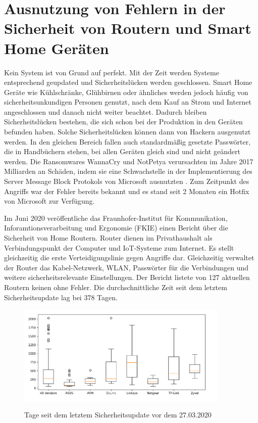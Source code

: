 \documentclass[12pt, a4paper, onecolumn, oneside, toc=bibliographynumbered, liststotoc]{scrreprt} %
\begin{document}
	\section{Ausnutzung von Fehlern in der Sicherheit von Routern und Smart Home Geräten}
 Kein System ist von Grund auf perfekt. Mit der Zeit werden Systeme entsprechend geupdated und Sicherheitslücken werden geschlossen. Smart Home Geräte wie Kühlschränke, Glühbirnen oder ähnliches werden jedoch häufig von sicherheitsunkundigen Personen genutzt, nach dem Kauf an Strom und Internet angeschlossen und danach nicht weiter beachtet. Dadurch bleiben Sicherheitslücken bestehen, die sich schon bei der Produktion in den Geräten befunden haben. Solche Sicherheitslücken können dann von Hackern ausgenutzt werden. In den gleichen Bereich fallen auch standardmäßig gesetzte Passwörter, die in Handbüchern stehen, bei allen Geräten gleich sind und nicht geändert werden. Die Ransomwares WannaCry und NotPetya verursachten im Jahre 2017 Milliarden an Schäden, indem sie eine Schwachstelle in der Implementierung des Server Message Block Protokols von Microsoft ausnutzten \parencite[5]{Chantzis.2021}. Zum Zeitpunkt des Angriffs war der Fehler bereits bekannt und es stand seit 2 Monaten ein Hotfix von Microsoft zur Verfügung.
 
 Im Juni 2020 veröffentliche das Fraunhofer-Institut für Kommunikation, Inforamtionsverarbeitung und Ergonomie (FKIE) einen Bericht über die Sicherheit von Home Routern. Router dienen im Privathaushalt als Verbindungspunkt der Computer und IoT-Systeme zum Internet. Es stellt gleichzeitig die erste Verteidigungslinie gegen Angriffe dar. Gleichzeitig verwaltet der Router das Kabel-Netzwerk, WLAN, Passwörter für die Verbindungen und weitere sicherheitsrelevante Einstellungen. Der Bericht listete von 127 aktuellen Routern keinen ohne Fehler. Die durchschnittliche Zeit seit dem letztem Sicherheitsupdate lag bei 378 Tagen.
\begin{figure}[H]
	\centering
	\caption{Tage seit dem letztem Sicherheitsupdate vor dem 27.03.2020}
	\includegraphics[width=0.9\textwidth]{Sicherheitsupdates.png}
	\label{Sicherheitsupdates}
\end{figure}
            
\end{document}
